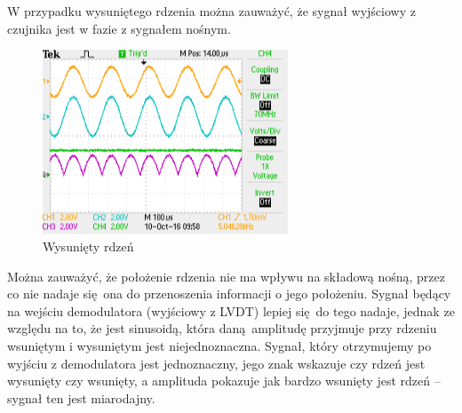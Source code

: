 \documentclass[a4paper, 12pt, titlepage]{article}
\begin{document}
				W przypadku wysuniętego rdzenia można zauważyć, że sygnał wyjściowy z czujnika jest w fazie z sygnałem nośnym.
				\begin{figure}[H]
					\centering
					\includegraphics[width=0.65\textwidth]{./img/rozciagniete.png}
					\caption{\small{Wysunięty rdzeń}}
				\end{figure} \noindent
				Można zauważyć, że położenie rdzenia nie ma wpływu na składową nośną, przez co nie nadaje się ona do przenoszenia informacji o jego położeniu. Sygnał będący na wejściu demodulatora (wyjściowy z LVDT) lepiej się do tego nadaje, jednak ze względu na to, że jest sinusoidą, która daną amplitudę przyjmuje przy rdzeniu wsuniętym i wysuniętym jest niejednoznaczna. Sygnał, który otrzymujemy po wyjściu z demodulatora jest jednoznaczny, jego znak wskazuje czy rdzeń jest wysunięty czy wsunięty, a amplituda pokazuje jak bardzo wsunięty jest rdzeń -- sygnał ten jest miarodajny.
\end{document}
